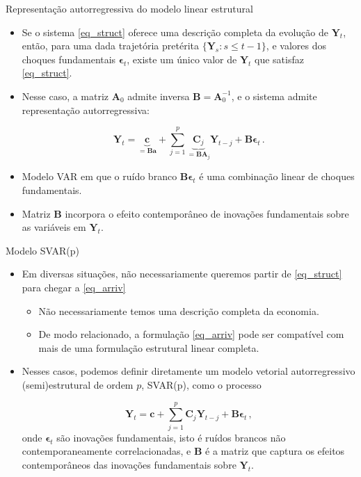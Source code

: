 \documentclass[11pt]{beamer}
\begin{document}
\begin{frame}{Representação autorregressiva do modelo linear estrutural}
	\begin{itemize}
		\item Se o sistema \eqref{eq_struct} oferece uma descrição {\color{blue}completa} da evolução de $\boldsymbol{Y}_t$, então, para uma dada trajetória pretérita $\{\boldsymbol{Y}_s: s \leq t-1\}$, e valores dos choques fundamentais $\boldsymbol{\epsilon}_t$, existe um único valor de $\boldsymbol{Y}_t$  que satisfaz \eqref{eq_struct}.
		\item Nesse caso, a matriz $\boldsymbol{A}_0$ admite inversa $\boldsymbol{B}= \boldsymbol{A}_0^{-1}$, e o sistema admite {\color{blue}representação autorregressiva}:
		
		\begin{equation}
			\label{eq_arriv}
			\boldsymbol{Y}_t = \underbrace{\boldsymbol{c}}_{= \boldsymbol{B}\boldsymbol{a}} + \sum_{j=1}^p \underbrace{\boldsymbol{C}_j}_{=\boldsymbol{B} \boldsymbol{A}_j} \boldsymbol{Y}_{t-j}  + \boldsymbol{B}\boldsymbol{\epsilon}_t\, .
		\end{equation}
		
		\item Modelo VAR em que o ruído branco $\boldsymbol{B}\boldsymbol{\epsilon}_t$ é uma combinação linear de choques fundamentais.
		\item Matriz $\boldsymbol{B}$ incorpora o efeito contemporâneo de inovações fundamentais sobre as variáveis em $\boldsymbol{Y}_t$. 
	\end{itemize}
\end{frame}

\begin{frame}{Modelo SVAR(p)}
\begin{itemize}
	\item 	Em diversas situações, não necessariamente queremos partir de \eqref{eq_struct} para chegar a \eqref{eq_arriv}
	\begin{itemize}
		\item Não necessariamente temos uma descrição completa da economia.
		\item De modo relacionado, a formulação \eqref{eq_arriv} pode ser compatível com mais de uma formulação estrutural linear completa.
	\end{itemize}
	\item Nesses casos, podemos definir diretamente {\color{blue}um modelo vetorial autorregressivo (semi)estrutural de ordem $p$}, SVAR(p), como o processo
	
		\begin{equation}
		\label{eq_svar}
		\boldsymbol{Y}_t = \boldsymbol{c}+ \sum_{j=1}^p \boldsymbol{C}_j \boldsymbol{Y}_{t-j} + \boldsymbol{B}\boldsymbol{\epsilon}_t\, ,
	\end{equation}
	onde $\boldsymbol{\epsilon}_t$ são inovações fundamentais, isto é ruídos brancos não contemporaneamente correlacionadas, e $\boldsymbol{B}$ é a matriz que captura os efeitos contemporâneos das inovações fundamentais sobre $\boldsymbol{Y}_t$.
\end{itemize}
\end{frame}
\end{document}
